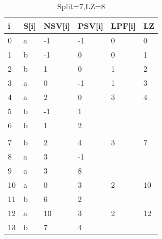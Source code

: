 \begin{table}[h]
\begin{tabular}{@{}llllll@{}}
\toprule
i  & S{[}i{]} & NSV{[}i{]} & PSV{[}i{]} & LPF{[}i{]} & LZ \\ \midrule
0  & a        & -1         & -1         & 0          & 0  \\
1  & b        & -1         & 0          & 0          & 1  \\
2  & b        & 1          & 0          & 1          & 2  \\
3  & a        & 0          & -1         & 1          & 3  \\
4  & a        & 2          & 0          & 3          & 4  \\
5  & b        & -1         & 1          &            &    \\
6  & b        & 1          & 2          &            &    \\
   &          &            &            &            &    \\
7  & b        & 2          & 4          & 3          & 7  \\
8  & a        & 3          & -1         &            &    \\
9  & a        & 3          & 8          &            &    \\
10 & a        & 0          & 3          & 2          & 10 \\
11 & b        & 6          & 2          &            &    \\
12 & a        & 10         & 3          & 2          & 12 \\
13 & b        & 7          & 4          &            &    \\ \bottomrule
\end{tabular}
\caption{Split=7,LZ=8}
\end{table}


